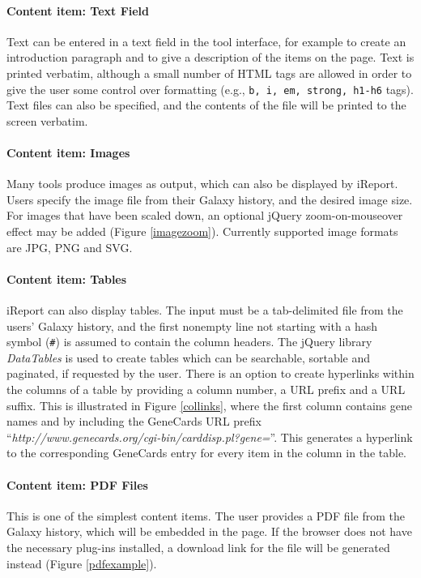\paragraph*{Content item: Text Field}
Text can be entered in a text field in the tool interface, for example to create an introduction paragraph and to give a description of the items on the page. Text is printed verbatim, although a small number of HTML tags are allowed in order to give the user some control over formatting (e.g., \verb+b, i, em, strong, h1-h6+ tags). Text files can also be specified, and the contents of the file will be printed to the screen verbatim.

\paragraph*{Content item: Images}
Many tools produce images as output, which can also be displayed by iReport. Users specify the image file from their Galaxy history, and the desired image size. For images that have been scaled down, an optional jQuery zoom-on-mouseover effect may  be added (Figure \ref{imagezoom})\cite{url-jqueryzoom}. Currently supported image formats are JPG, PNG and SVG.

\paragraph*{Content item: Tables}
iReport can also display tables. The input must be a tab-delimited file from the users' Galaxy history, and the first nonempty line not starting with a hash symbol (\verb+#+) is assumed to contain the column headers. The jQuery library \emph{DataTables} \cite{url-datatables} is used to create tables which can be searchable, sortable and paginated, if requested by the user. There is an option to create hyperlinks within the columns of a table by providing a column number, a URL prefix and a URL suffix. This is illustrated in Figure \ref{collinks}, where the first column contains gene names and by including the GeneCards \cite{genecardspaper,url-genecards} URL prefix ``\emph{http://www.genecards.org/cgi-bin/carddisp.pl?gene=}''. This generates a hyperlink to the corresponding GeneCards entry for every item in the column in the table.

\paragraph*{Content item: PDF Files}
This is one of the simplest content items. The user provides a PDF file from the Galaxy history, which will be embedded in the page. If the browser does not have the necessary plug-ins installed, a download link for the file will be generated instead (Figure \ref{pdfexample}).

